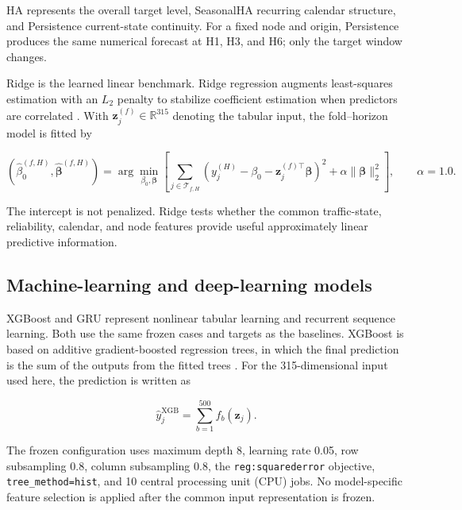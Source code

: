 \documentclass[pdflatex,sn-basic,Numbered]{sn-jnl}
\begin{document}
HA represents the overall target level, SeasonalHA recurring calendar structure, and Persistence current-state continuity. For a fixed node and origin, Persistence produces the same numerical forecast at H1, H3, and H6; only the target window changes.

Ridge is the learned linear benchmark. Ridge regression augments least-squares estimation with an $L_2$ penalty to stabilize coefficient estimation when predictors are correlated \cite{HoerlKennard1970Ridge}. With $\mathbf{z}_{j}^{(f)}\in\mathbb{R}^{315}$ denoting the tabular input, the fold--horizon model is fitted by

\begin{equation}
(\widehat{\beta}_{0}^{(f,H)},\widehat{\boldsymbol{\beta}}^{(f,H)})
=\arg\min_{\beta_0,\boldsymbol{\beta}}
\left[\sum_{j\in\mathcal{T}_{f,H}}
\left(y_j^{(H)}-\beta_0-\mathbf{z}_{j}^{(f)\top}\boldsymbol{\beta}\right)^2
+\alpha\|\boldsymbol{\beta}\|_2^2\right],
\qquad \alpha=1.0.
\label{eq:ridge}
\end{equation}

The intercept is not penalized. Ridge tests whether the common traffic-state, reliability, calendar, and node features provide useful approximately linear predictive information.

\subsection{Machine-learning and deep-learning models}
\label{subsec:ml-dl}

XGBoost and GRU represent nonlinear tabular learning and recurrent sequence learning. Both use the same frozen cases and targets as the baselines. XGBoost is based on additive gradient-boosted regression trees, in which the final prediction is the sum of the outputs from the fitted trees \cite{ChenGuestrin2016XGBoost}. For the 315-dimensional input used here, the prediction is written as

\begin{equation}
\widehat{y}_{j}^{\mathrm{XGB}}=\sum_{b=1}^{500}f_b(\mathbf{z}_j).
\label{eq:xgboost_prediction}
\end{equation}

The frozen configuration uses maximum depth 8, learning rate 0.05, row subsampling 0.8, column subsampling 0.8, the \texttt{reg:squarederror} objective, \texttt{tree\_method=hist}, and 10 central processing unit (CPU) jobs. No model-specific feature selection is applied after the common input representation is frozen.
\end{document}
